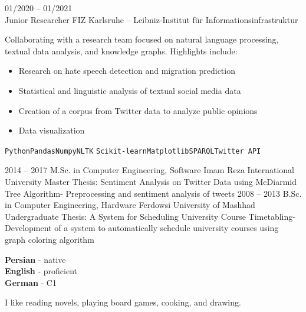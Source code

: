 \documentclass[9pt]{developercv} %
\begin{document}
\begin{entrylist}
{        }
    	\entry
    		{01/2020 -- 01/2021\\}
    		{Junior Researcher}
    		{FIZ Karlsruhe – Leibniz-Institut für Informationsinfrastruktur}
    		{Collaborating with a research team focused on natural language processing, textual data analysis, and knowledge graphs. Highlights include:
            \begin{itemize}
                \item Research on hate speech detection and migration prediction
                \item Statistical and linguistic analysis of textual social media data
                \item Creation of a corpus from Twitter data to analyze public opinions
                \item Data visualization
            \end{itemize}
            \texttt{Python}\slashsep\texttt{Pandas}\slashsep\texttt{Numpy}\slashsep\texttt{NLTK}\slashsep
            \texttt{Scikit-learn}\slashsep\texttt{Matplotlib}\slashsep\texttt{SPARQL}\slashsep\texttt{Twitter API}
            }
    \end{entrylist}


    \pagebreak
	\begin{entrylist}
		\entry
		{2014 – 2017}
		{M.Sc. in Computer Engineering, Software}
		{Imam Reza International University}
		{Master Thesis: Sentiment Analysis on Twitter Data using McDiarmid Tree Algorithm- Preprocessing and sentiment analysis of tweets}
		\entry
		{2008 – 2013}
		{B.Sc. in Computer Engineering, Hardware}
		{Ferdowsi University of Mashhad}
		{Undergraduate Thesis: A System for Scheduling University Course Timetabling- Development of a system to automatically schedule university courses using graph coloring algorithm}
	\end{entrylist}

	\begin{minipage}[t]{0.3\textwidth}
	    \vspace{-\baselineskip} %


		\textbf{Persian} - native\\
		\textbf{English} - proficient\\
		\textbf{German} - C1
	\end{minipage}
    \hfill
	\begin{minipage}[t]{0.5\textwidth}
	    \vspace{-\baselineskip} %


		I like reading novels, playing board games, cooking, and drawing.
	\end{minipage}
	\hfill
    \vfill

	
\end{document}
